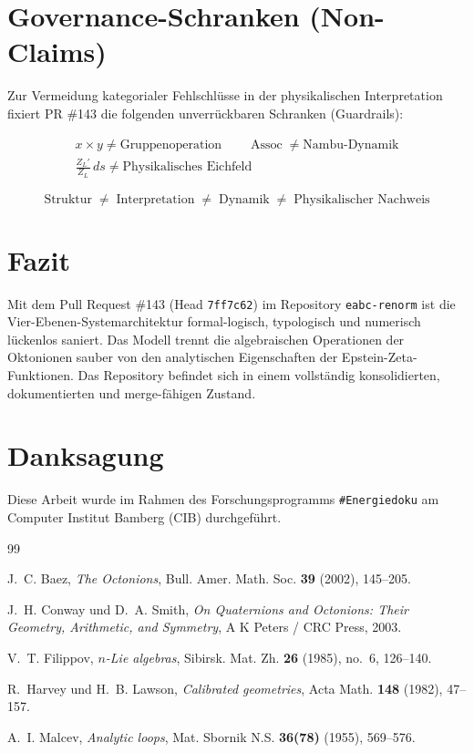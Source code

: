 \documentclass[11pt,a4paper]{article}
\theoremstyle{definition}
\newcommand{\Assoc}{\operatorname{Assoc}}
\begin{document}
	\section{Governance-Schranken (Non-Claims)}
	
	Zur Vermeidung kategorialer Fehlschlüsse in der physikalischen Interpretation fixiert PR \#143 die folgenden unverrückbaren Schranken (Guardrails):
	
	\begin{equation}
		\begin{gathered}
			\boxed{x \times y \neq \text{Gruppenoperation}} \qquad
			\boxed{\Assoc \neq \text{Nambu-Dynamik}} \\[1.2ex]
			\boxed{\frac{Z_L'}{Z_L}\,ds \neq \text{Physikalisches Eichfeld}}
		\end{gathered}
	\end{equation}
	
	\begin{equation}
		\boxed{\text{Struktur} \;\neq\; \text{Interpretation} \;\neq\; \text{Dynamik} \;\neq\; \text{Physikalischer Nachweis}}
	\end{equation}
	
	\section{Fazit}
	
	Mit dem Pull Request \#143 (Head \texttt{7ff7c62}) im Repository \texttt{eabc-renorm} ist die Vier-Ebenen-Systemarchitektur formal-logisch, typologisch und numerisch lückenlos saniert. Das Modell trennt die algebraischen Operationen der Oktonionen sauber von den analytischen Eigenschaften der Epstein-Zeta-Funktionen. Das Repository befindet sich in einem vollständig konsolidierten, dokumentierten und merge-fähigen Zustand.
	
	\section*{Danksagung}
	Diese Arbeit wurde im Rahmen des Forschungsprogramms \texttt{\#Energiedoku} am Computer Institut Bamberg (CIB) durchgeführt.
	
	\begin{thebibliography}{99}
		
		J.~C. Baez, \emph{The Octonions}, Bull. Amer. Math. Soc. \textbf{39} (2002), 145--205.
		
		J.~H. Conway und D.~A. Smith, \emph{On Quaternions and Octonions: Their Geometry, Arithmetic, and Symmetry}, A K Peters / CRC Press, 2003.
		
		V.~T. Filippov, \emph{$n$-Lie algebras}, Sibirsk. Mat. Zh. \textbf{26} (1985), no.~6, 126--140.
		
		R.~Harvey und H.~B. Lawson, \emph{Calibrated geometries}, Acta Math. \textbf{148} (1982), 47--157.
		
		A.~I. Malcev, \emph{Analytic loops}, Mat. Sbornik N.S. \textbf{36(78)} (1955), 569--576.
		
	\end{thebibliography}
	
\end{document}
